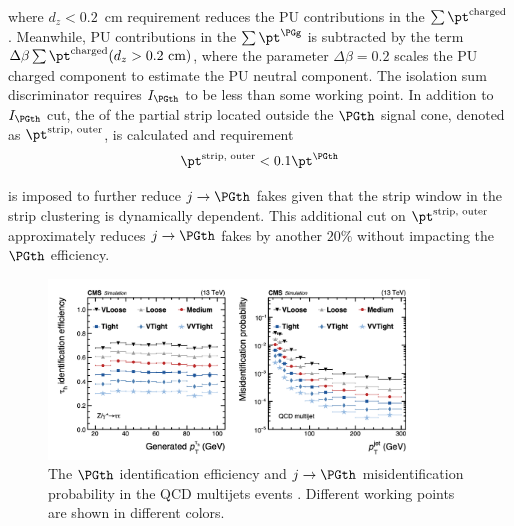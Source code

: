 \noindent where $d_z<0.2$~cm requirement reduces the PU contributions in the $\sum \pt^{\text{charged}}$. Meanwhile, PU contributions in the $\sum \pt^ \PGg $ is subtracted by the term $\Delta \beta \sum \pt^{\text{charged}} (d_z>0.2~\text{cm}) $, where the parameter $\Delta \beta =0.2$ scales the PU charged component to estimate the PU neutral component. The isolation sum discriminator requires $I_{\PGth} $ to be less than some working point. In addition to $I_{\PGth}$ cut, the \pt of the partial strip located outside the $\PGth$ signal cone, denoted as $\pt^{\text{strip, outer}} $, is calculated and requirement
\begin{equation}
    \pt^{\text{strip, outer}} < 0.1 \pt^{\PGth}
    \label{eqn:cmsExperiment:reconstruction:ptStripOuter}
\end{equation}

\noindent is imposed to further reduce $j \to \PGth$ fakes given that the strip window in the strip clustering is dynamically \pt dependent. This additional cut on $\pt^{\text{strip, outer}}$ approximately reduces $j \to \PGth$ fakes by another $20\%$ without impacting the $\PGth$ efficiency.


\begin{figure}[ht]
    \centering
    \includegraphics[width=0.9\textwidth]{chapters/CMSExperiment/sectionReconstruction/figures/tauMVA}
    \caption{ The $\PGth$ identification efficiency and $j\to \PGth$ misidentification probability in the QCD multijets events \cite{Sirunyan:2018pgf}. Different working points are shown in different colors. }
    \label{fig:cmsExperiment:reconstruction:tauMVA}
\end{figure}



